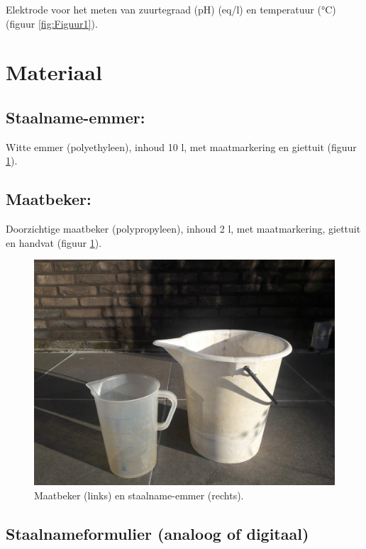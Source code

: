 \documentclass[
]{scrreprt}
\begin{document}
Elektrode voor het meten van zuurtegraad (pH) (eq/l) en temperatuur (°C) (figuur \ref{fig:Figuur1}).

\hypertarget{materiaal}{%
\section{Materiaal}\label{materiaal}}

\hypertarget{staalname-emmer}{%
\subsection{Staalname-emmer:}\label{staalname-emmer}}

Witte emmer (polyethyleen), inhoud 10 l, met maatmarkering en giettuit (figuur \ref{fig:Figuur2}).

\hypertarget{maatbeker}{%
\subsection{Maatbeker:}\label{maatbeker}}

Doorzichtige maatbeker (polypropyleen), inhoud 2 l, met maatmarkering, giettuit en handvat (figuur \ref{fig:Figuur2}).

\begin{figure}
\includegraphics[width=1\linewidth]{./media/image2} \caption{Maatbeker (links) en staalname-emmer (rechts).}\label{fig:Figuur2}
\end{figure}

\hypertarget{staalnameformulier-analoog-of-digitaal}{%
\subsection{Staalnameformulier (analoog of digitaal)}\label{staalnameformulier-analoog-of-digitaal}}
\end{document}
